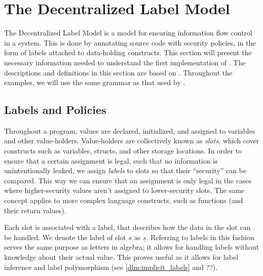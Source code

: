 
\newcommand{\labelof}[1]{\underline{#1}}
\newcommand{\dlmc}[1]{\lstinline[style=dlmc]{#1}}
\newcommand{\dlmactsfor}{\dlmc{if\_acts\_for}}
\newcommand{\dlmdeclassify}{\dlmc{declassify}}
\newcommand{\dlmpc}{$\underline{pc}$}
\newcommand{\mathcomment}[1]{\color{green!50!black}{#1}}

\section{The Decentralized Label Model}
The Decentralized Label Model \cite{myers1997, myers1998, myers2000} is a model for ensuring information flow control in a system.
This is done by annotating source code with security policies, in the form of labels attached to data-holding constructs.
This section will present the necessary information needed to understand the first implementation of \thetool. 
The descriptions and definitions in this section are based on \cite{myers1997, myers1998, myers2000}.
Throughout the examples, we will use the same grammar as that used by \thetool. 

\subsection{Labels and Policies}
Throughout a program, values are declared, initialized, and assigned to variables and other value-holders.
Value-holders are collectively known as \emph{slots}, which cover constructs such as variables, structs, and other storage locations.
In order to ensure that a certain assignment is legal, such that no information is unintentionally leaked, we assign \emph{labels} to slots so that their ``security'' can be compared.
This way we can ensure that an assignment is only legal in the cases where higher-security values aren't assigned to lower-security slots.
The same concept applies to more complex language constructs, such as functions (and their return values).

Each slot is associated with a label, that describes how the data in the slot can be handled.
We denote the label of slot $s$ as $\underline{s}$.
Referring to labels in this fashion serves the same purpose as letters in algebra; it allows for handling labels without knowledge about their actual value.
This proves useful as it allows for label inference and label polymorphism (see \cref{dlm:implicit_labels} and ??). 

